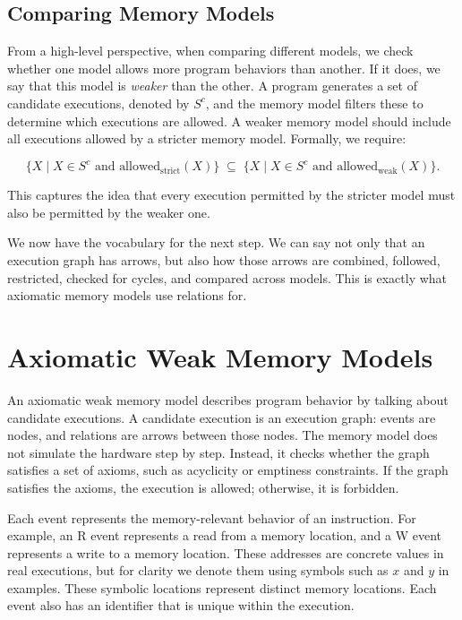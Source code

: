 \subsection{Comparing Memory Models}

From a high-level perspective, when comparing different models, we check whether one model allows more program behaviors than another. If it does, we say that this model is \emph{weaker} than the other. A program generates a set of candidate executions, denoted by \( S^c \), and the memory model filters these to determine which executions are allowed. A weaker memory model should include all executions allowed by a stricter memory model. Formally, we require:

\[
\{ X \mid X \in S^c \text{ and } \text{allowed}_{\text{strict}}(X) \}
\;\subseteq\;
\{ X \mid X \in S^c \text{ and } \text{allowed}_{\text{weak}}(X) \}.
\]

This captures the idea that every execution permitted by the stricter model must also be permitted by the weaker one.

We now have the vocabulary for the next step. We can say not only that an execution graph has arrows, but also how those arrows are combined, followed, restricted, checked for cycles, and compared across models. This is exactly what axiomatic memory models use relations for.

\section{Axiomatic Weak Memory Models}

\label{Background:AWMM}

An axiomatic weak memory model describes program behavior by talking about candidate executions. A candidate execution is an execution graph: events are nodes, and relations are arrows between those nodes. The memory model does not simulate the hardware step by step. Instead, it checks whether the graph satisfies a set of axioms, such as acyclicity or emptiness constraints. If the graph satisfies the axioms, the execution is allowed; otherwise, it is forbidden.

Each event represents the memory-relevant behavior of an instruction. For example, an R event represents a read from a memory location, and a W event represents a write to a memory location. These addresses are concrete values in real executions, but for clarity we denote them using symbols such as $x$ and $y$ in examples. These symbolic locations represent distinct memory locations. Each event also has an identifier that is unique within the execution.

